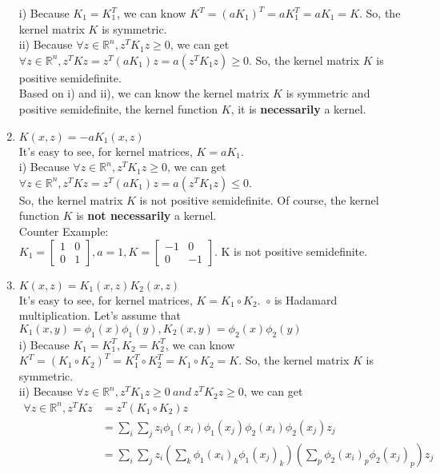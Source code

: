 \begin{answer}
\begin{enumerate}
i) Because $K_1 = K_1^T$, we can know $K^T = (a K_1)^T = a K_1^T = a K_1 = K$. So, the kernel matrix $K$ is symmetric.\\
ii) Because $\forall z \in \mathbb{R}^n, z^T K_1 z \geq 0$, we can get $\forall z \in \mathbb{R}^n, z^T K z = z^T (a K_1) z = a (z^T K_1 z)\geq 0$. So, the kernel matrix $K$ is positive semidefinite.\\
Based on i) and ii), we can know the kernel matrix $K$ is symmetric and positive semidefinite, the kernel function $K$, it is \textbf{necessarily} a kernel.
\item $K(x,z) = -a K_1(x,z)$\\
It's easy to see, for kernel matrices, $K = a K_1$.\\
i) Because $\forall z \in \mathbb{R}^n, z^T K_1 z \geq 0$, we can get $\forall z \in \mathbb{R}^n, z^T K z = z^T (a K_1) z = a (z^T K_1 z)\leq 0$.\\ So, the kernel matrix $K$ is not positive semidefinite. Of course, the kernel function $K$ is \textbf{not necessarily} a kernel.\\
Counter Example:\\
$K_1=\begin{bmatrix}1 & 0\\ 0 & 1\end{bmatrix}, a = 1, K = \begin{bmatrix}-1 & 0\\ 0 & -1 \end{bmatrix}$. K is not positive semidefinite.
\item $K(x,z) = K_1(x,z)K_2(x,z)$ \\
It's easy to see, for kernel matrices, $K = K_1 \circ K_2$.\ $\circ$ is Hadamard multiplication. Let's assume that $K_1(x, y) = \phi_1(x)\phi_1(y), K_2(x, y) = \phi_2(x)\phi_2(y)$\\
i) Because $K_1 = K_1^T, K_2 = K_2^T$, we can know $K^T = (K_1 \circ K_2)^T = K_1^T \circ K_2^T = K_1 \circ K_2 = K$. So, the kernel matrix $K$ is symmetric.\\
ii) Because $\forall z \in \mathbb{R}^n, z^T K_1 z \geq 0\ and\ z^T K_2 z \geq 0$, we can get 
\begin{align*}
    \forall z \in \mathbb{R}^n, z^T K z &= z^T (K_1 \circ K_2) z\\
    &= \sum\limits_i\sum\limits_j z_i \phi_1(x_i)\phi_1(x_j) \phi_2(x_i) \phi_2(x_j) z_j\\
    &=\sum\limits_i\sum\limits_j z_i (\sum\limits_k\phi_1(x_i)_k\phi_1(x_j)_k) (\sum\limits_p\phi_2(x_i)_p \phi_2(x_j)_p) z_j\\

\end{align*}
\end{enumerate}
\end{answer}
